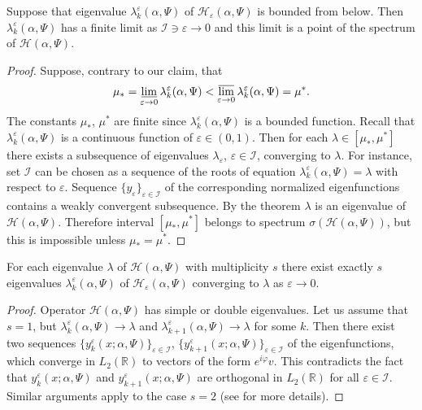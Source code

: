 \documentclass[11pt,english]{amsart}
\begin{document}
\begin{g_corollary}\label{Corr1}
Suppose that  eigenvalue $\lambda_k^\varepsilon(\alpha, \Psi)$ of $\mathcal{H}_{\varepsilon}(\alpha,\Psi)$ is bounded from below. Then $\lambda_k^\varepsilon(\alpha, \Psi)$ has a finite limit as $\mathcal{I}\ni \varepsilon\to 0$
and this limit is a point of the spectrum  of $\mathcal{H}(\alpha,\Psi)$.
\end{g_corollary}
\begin{proof}
Suppose, contrary to our claim, that
\begin{equation*}
    \mu_*=\varliminf_{\varepsilon\to 0}\lambda_k^\varepsilon(\alpha, \Psi)<\varlimsup_{\varepsilon\to 0}\lambda_k^\varepsilon(\alpha, \Psi)=\mu^*.
  \end{equation*}
The constants $\mu_*$, $\mu^*$ are finite since $\lambda_k^\varepsilon(\alpha, \Psi)$ is a bounded function.
Recall that $\lambda_k^\varepsilon(\alpha, \Psi)$ is a continuous function of $\varepsilon\in (0,1)$.
Then for each $\lambda\in [\mu_*,\mu^*]$ there exists  a subsequence of eigenvalues $\lambda_\varepsilon$, $\varepsilon\in \mathcal{I}$, converging to $\lambda$. For instance, set $\mathcal{I}$ can be chosen
as a sequence of the roots of  equation  $\lambda_k^\varepsilon(\alpha, \Psi)=\lambda$ with respect to $\varepsilon$.
Sequence $\{y_\varepsilon\}_{\varepsilon\in \mathcal{I}}$ of the corresponding normalized eigenfunctions contains a weakly convergent subsequence. By the theorem  $\lambda$ is an eigenvalue of  $\mathcal{H}(\alpha,\Psi)$.
Therefore interval $[\mu_*,\mu^*]$ belongs to spectrum $\sigma(\mathcal{H}(\alpha,\Psi))$, but this is impossible unless $\mu_*=\mu^*$.
\end{proof}

\begin{g_corollary}\label{Corr2} For each eigenvalue $\lambda$ of  $\mathcal{H}(\alpha,\Psi)$ with multiplicity $s$ there exist exactly $s$ eigenvalues $\lambda_k^\varepsilon(\alpha, \Psi)$ of $\mathcal{H}_{\varepsilon}(\alpha,\Psi)$
converging to $\lambda$ as $\varepsilon\to 0$.
\end{g_corollary}
\begin{proof} Operator $\mathcal{H}(\alpha,\Psi)$ has  simple or double eigenvalues.
Let us assume  that $s=1$, but  $\lambda_k^\varepsilon(\alpha, \Psi)\to \lambda$ and  $\lambda_{k+1}^\varepsilon(\alpha, \Psi)\to \lambda$ for some $k$. Then there exist two sequences $\{y_k^{\varepsilon}(x;\alpha, \Psi)\}_{\varepsilon\in \mathcal{I}}$, $\{y_{k+1}^{\varepsilon}(x;\alpha, \Psi)\}_{\varepsilon\in \mathcal{I}}$ of the eigenfunctions, which  converge in $L_2(\mathbb{R})$
to   vectors  of the form $e^{i\varphi} v$. This contradicts the fact that $y_k^{\varepsilon}(x;\alpha, \Psi)$
and $y_{k+1}^{\varepsilon}(x;\alpha, \Psi)$ are orthogonal in $L_2(\mathbb{R})$ for all $\varepsilon\in \mathcal{I}$. Similar arguments apply to the case $s=2$ (see \cite{GolovatyMMO} for more details).
\end{proof}
\end{document}
